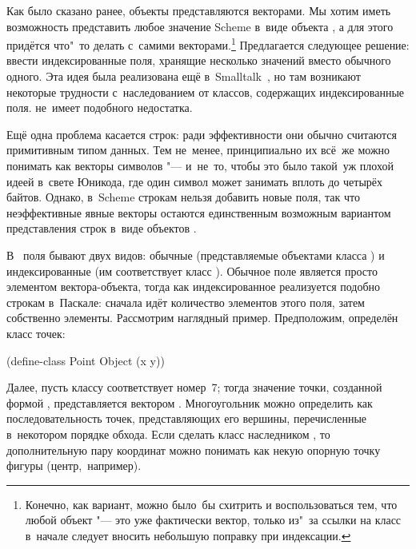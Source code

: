 Как было сказано ранее, объекты {\Meroonet} представляются векторами. Мы хотим
иметь возможность представить любое значение Scheme в~виде объекта {\Meroonet},
а для этого придётся что"~то делать с~самими векторами.\footnote*{Конечно, как
вариант, можно было~бы схитрить и воспользоваться тем, что любой объект
{\Meroonet} "--- это уже фактически вектор, только из"~за ссылки на класс
в~начале следует вносить небольшую поправку при индексации.} Предлагается
следующее решение: ввести индексированные поля, хранящие несколько значений
вместо обычного одного. Эта идея была реализована ещё в~Smalltalk~\cite{gr83},
но там возникают некоторые трудности с~наследованием от классов, содержащих
индексированные поля. {\Meroonet} не~имеет подобного недостатка.

Ещё одна проблема касается строк: ради эффективности они обычно считаются
примитивным типом данных. Тем не~менее, принципиально их всё~же можно понимать
как векторы символов "--- и~не~то, чтобы это было такой~уж плохой идеей в~свете
Юникода, где один символ может занимать вплоть до четырёх байтов. Однако,
в~Scheme строкам нельзя добавить новые поля, так что неэффективные явные векторы
остаются единственным возможным вариантом представления строк в~виде объектов
{\Meroonet}.

В~{\Meroonet} поля бывают двух видов: обычные (представляемые объектами класса
) и индексированные (им соответствует класс ).
Обычное поле является просто элементом вектора-объекта, тогда как
индексированное реализуется подобно строкам в~Паскале: сначала идёт количество
элементов этого поля, затем собственно элементы. Рассмотрим наглядный пример.
Предположим, определён класс точек:

\begin{code:lisp}
(define-class Point Object (x y))
\end{code:lisp}

Далее, пусть классу  соответствует номер~7; тогда значение точки,
созданной формой , представляется вектором . Многоугольник можно определить как последовательность точек,
представляющих его вершины, перечисленные в~некотором порядке обхода. Если
сделать класс  наследником , то дополнительную пару
координат можно понимать как некую опорную точку фигуры (центр,~например).

